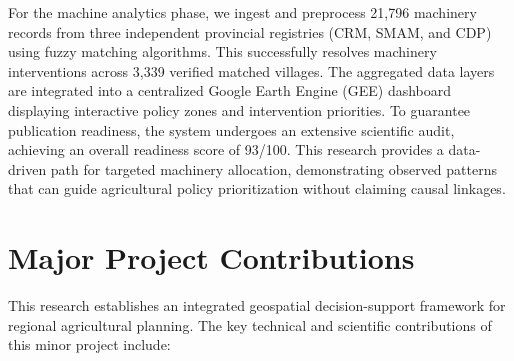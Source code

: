 \documentclass[12pt,a4paper]{report}
\begin{document}
For the machine analytics phase, we ingest and preprocess 21,796 machinery records from three independent provincial registries (CRM, SMAM, and CDP) using fuzzy matching algorithms. This successfully resolves machinery interventions across 3,339 verified matched villages. The aggregated data layers are integrated into a centralized Google Earth Engine (GEE) dashboard displaying interactive policy zones and intervention priorities. To guarantee publication readiness, the system undergoes an extensive scientific audit, achieving an overall readiness score of 93/100. This research provides a data-driven path for targeted machinery allocation, demonstrating observed patterns that can guide agricultural policy prioritization without claiming causal linkages.

\chapter*{Major Project Contributions}
This research establishes an integrated geospatial decision-support framework for regional agricultural planning. The key technical and scientific contributions of this minor project include:

\vspace{1cm}
\end{document}
